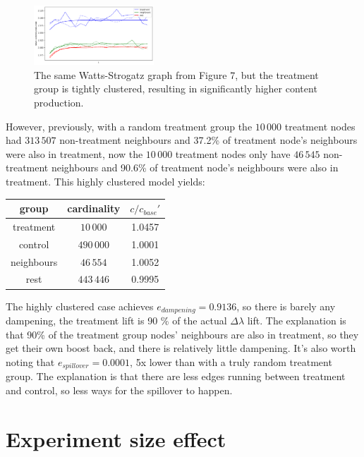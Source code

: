 \documentclass[final,5p,times,twocolumn,authoryear]{elsarticle}
\begin{document}
\begin{figure}[h]
	\centering 
	\includegraphics[width=0.4\textwidth]{figure-13.png}	
	\caption{The same Watts-Strogatz graph from Figure 7, but the treatment group is tightly clustered, resulting in significantly higher content production.} 
\end{figure}

However, previously, with a random treatment group the $10\,000$ treatment nodes had $313\,507$ non-treatment neighbours and 37.2\% of treatment node's neighbours were also in treatment, now the $10\,000$ treatment nodes only have $46\,545$ non-treatment neighbours and 90.6\% of treatment node's neighbours were also in treatment. This highly clustered model yields:

\begin{center}
\begin{tabular}{ |c|c|c| } 
 \hline
 \textbf{group} & \textbf{cardinality} & $c / c_{base}\prime$ \\ 
 \hline
 treatment   &  $10\,000$   &  1.0457 \\ 
 control     &  $490\,000$  &  1.0001 \\ 
 neighbours  &  $46\,554$   &  1.0052 \\ 
 rest        &  $443\,446$  &  0.9995 \\ 
 \hline
\end{tabular}
\end{center}

The highly clustered case achieves $e_{dampening} = 0.9136$, so there is barely any dampening, the treatment lift is 90 \% of the actual $\Delta \lambda$ lift. The explanation is that 90\% of the treatment group nodes' neighbours are also in treatment, so they get their own boost back, and there is relatively little dampening. It's also worth noting that $e_{spillover} = 0.0001$, 5x lower than with a truly random treatment group. The explanation is that there are less edges running between treatment and control, so less ways for the spillover to happen.

\section{Experiment size effect}
\end{document}
